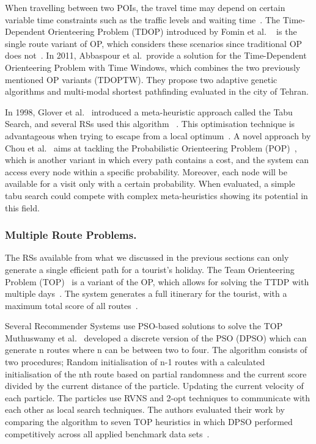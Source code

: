 When travelling between two POIs, the travel time may depend on certain
variable time constraints such as the traffic levels and waiting time~\cite{Herzog2020}.
The Time-Dependent Orienteering Problem (TDOP) introduced by Fomin et al.
~\cite{Fomin2002} is the single route variant of OP, which considers
these scenarios since traditional OP does not~\cite{Gunawan2016}. In 2011, Abbaspour et
al.~\cite{Abbaspour2011}provide a solution for the
Time-Dependent Orienteering Problem with Time Windows, which combines the two
previously mentioned OP variants (TDOPTW).  They propose two adaptive genetic
algorithms and multi-modal shortest pathfinding evaluated in the city of
Tehran.

In 1998, Glover et al.~\cite{Glover1998} introduced a meta-heuristic approach called the
Tabu Search, and several RSs used this algorithm
~\cite{Tang2005,Sylejmani2012,Chou2021}. This optimisation technique is
advantageous when trying to escape
from a local optimum~\cite{Chou2021}. A novel approach by Chou et al.~\cite{Chou2021} aims at
tackling the Probabilistic Orienteering Problem (POP)~\cite{POP}, which
is another variant in which every path contains a cost, and the system can
access every node within a specific probability. Moreover, each node will be
available for a visit only with a certain probability. When evaluated, a simple
tabu search could compete with complex meta-heuristics showing its potential in
this field.



\subsubsection{Multiple Route Problems.}

The RSs available from what we discussed in the previous sections can only
generate a single efficient path for a tourist's holiday. The Team Orienteering
Problem (TOP)~\cite{Chao1996} is a variant of the OP, which allows for
solving the TTDP with multiple days~\cite{Sylejmani2017}. The system generates a full
itinerary for the tourist, with a maximum total score of all routes~\cite{Herzog2020}.

Several Recommender Systems use PSO-based solutions to solve the TOP
~\cite{Muthuswamy2011,Wisittipanich2020,Yu2019}
Muthuswamy et al.~\cite{Muthuswamy2011} developed a discrete version of the PSO (DPSO)
which can generate n routes
where n can be between two to four. The algorithm consists of two procedures;
Random initialisation of n-1 routes with a calculated initialisation of the nth
route based on partial randomness and the current score divided by the current
distance of the particle.  Updating the current velocity of each particle.  The
particles use RVNS and 2-opt techniques to communicate with each other as local
search techniques. The authors evaluated their work by comparing the algorithm
to seven TOP heuristics in which DPSO performed competitively across all
applied benchmark data sets~\cite{Gavalas2014a}.

